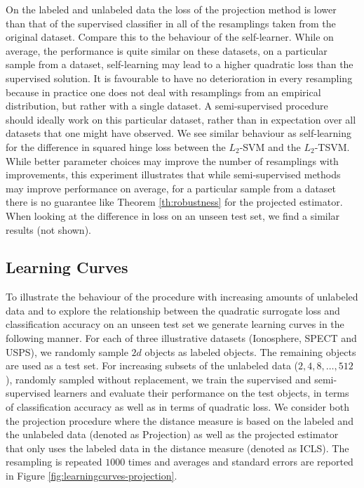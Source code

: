 \documentclass[twoside]{memoir}\usepackage[]{graphicx}\usepackage{xcolor}
\begin{document}
On the labeled and unlabeled data the loss of the projection method is lower than that of the supervised classifier in all of the resamplings taken from the original dataset. Compare this to the behaviour of the self-learner. While on average, the performance is quite similar on these datasets, on a particular sample from a dataset, self-learning may lead to a higher quadratic loss than the supervised solution. It is favourable to have no deterioration in every resampling because in practice one does not deal with resamplings from an empirical distribution, but rather with a single dataset. A semi-supervised procedure should ideally work on this particular dataset, rather than in expectation over all datasets that one might have observed. We see similar behaviour as self-learning for the difference in squared hinge loss between the $L_2$-SVM and the $L_2$-TSVM. While better parameter choices may improve the number of resamplings with improvements, this experiment illustrates that while semi-supervised methods may improve performance on average, for a particular sample from a dataset there is no guarantee like Theorem \ref{th:robustness} for the projected estimator. When looking at the difference in loss on an unseen test set, we find a similar results (not shown).

\subsection{Learning Curves}
To illustrate the behaviour of the procedure with increasing amounts of unlabeled data and to explore the relationship between the quadratic surrogate loss and classification accuracy on an unseen test set we generate learning curves in the following manner. For each of three illustrative datasets (Ionosphere, SPECT and USPS), we randomly sample $2 d$ objects as labeled objects. The remaining objects are used as a test set. For increasing subsets of the unlabeled data ($2,4,8,\dots,512$), randomly sampled without replacement, we train the supervised and semi-supervised learners and evaluate their performance on the test objects, in terms of classification accuracy as well as in terms of quadratic loss. We consider both the projection procedure where the distance measure is based on the labeled and the unlabeled data (denoted as Projection) as well as the projected estimator that only uses the labeled data in the distance measure (denoted as ICLS). The resampling is repeated $1000$ times and averages and standard errors are reported in Figure \ref{fig:learningcurves-projection}.
\end{document}
